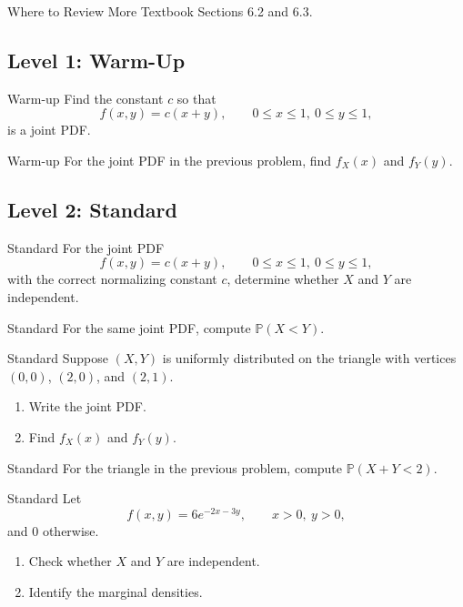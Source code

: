 \documentclass[12pt]{article}
\newcommand{\PP}{\mathbb{P}}
\newcommand{\writespace}[1]{\vspace*{#1}}
\newcommand{\medws}{\writespace{1.8cm}}
\newcommand{\longws}{\writespace{2.8cm}}
\newcommand{\xlongws}{\writespace{4.1cm}}
\newcounter{problem}[section]
\begin{document}
\begin{reviewbox}{Where to Review More}
Textbook Sections 6.2 and 6.3.
\end{reviewbox}

\subsection*{Level 1: Warm-Up}

\begin{practiceproblem}{Warm-up}
Find the constant $c$ so that
\[
  f(x,y)=c(x+y), \qquad 0\le x\le 1,\ 0\le y\le 1,
\]
is a joint PDF.
\end{practiceproblem}
\medws

\begin{practiceproblem}{Warm-up}
For the joint PDF in the previous problem, find $f_X(x)$ and $f_Y(y)$.
\end{practiceproblem}
\medws

\subsection*{Level 2: Standard}

\begin{practiceproblem}{Standard}
For the joint PDF
\[
  f(x,y)=c(x+y), \qquad 0\le x\le 1,\ 0\le y\le 1,
\]
with the correct normalizing constant $c$, determine whether $X$ and $Y$ are independent.
\end{practiceproblem}
\medws

\begin{practiceproblem}{Standard}
For the same joint PDF, compute $\PP(X<Y)$.
\end{practiceproblem}
\longws

\begin{practiceproblem}{Standard}
Suppose $(X,Y)$ is uniformly distributed on the triangle with vertices $(0,0)$, $(2,0)$, and $(2,1)$.
\begin{enumerate}
  \item Write the joint PDF.
  \item Find $f_X(x)$ and $f_Y(y)$.
\end{enumerate}
\end{practiceproblem}
\xlongws

\begin{practiceproblem}{Standard}
For the triangle in the previous problem, compute $\PP(X+Y<2)$.
\end{practiceproblem}
\longws

\begin{practiceproblem}{Standard}
Let
\[
  f(x,y)=6e^{-2x-3y},\qquad x>0,\ y>0,
\]
and $0$ otherwise.
\begin{enumerate}
  \item Check whether $X$ and $Y$ are independent.
  \item Identify the marginal densities.
\end{enumerate}
\end{practiceproblem}
\medws
\end{document}
